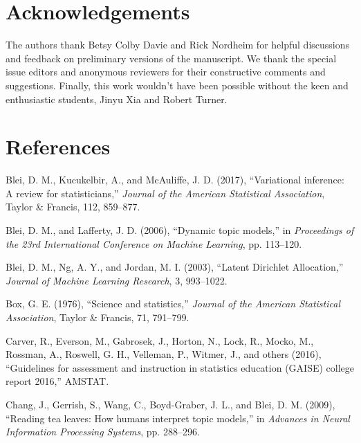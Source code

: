 \documentclass[
]{article}
\begin{document}
\hypertarget{acknowledgements}{%
\section{Acknowledgements}\label{acknowledgements}}

The authors thank Betsy Colby Davie and Rick Nordheim for helpful discussions and
feedback on preliminary versions of the manuscript. We thank the special issue
editors and anonymous reviewers for their constructive comments and suggestions. Finally, this work wouldn't have been possible without the keen and enthusiastic students, Jinyu Xia and Robert Turner.

\hypertarget{references}{%
\section{References}\label{references}}

\hypertarget{refs}{}
\leavevmode\hypertarget{ref-blei2017variational}{}%
Blei, D. M., Kucukelbir, A., and McAuliffe, J. D. (2017), ``Variational inference: A review for statisticians,'' \emph{Journal of the American Statistical Association}, Taylor \& Francis, 112, 859--877.

\leavevmode\hypertarget{ref-blei2006dynamic}{}%
Blei, D. M., and Lafferty, J. D. (2006), ``Dynamic topic models,'' in \emph{Proceedings of the 23rd International Conference on Machine Learning}, pp. 113--120.

\leavevmode\hypertarget{ref-blei2003latent}{}%
Blei, D. M., Ng, A. Y., and Jordan, M. I. (2003), ``Latent Dirichlet Allocation,'' \emph{Journal of Machine Learning Research}, 3, 993--1022.

\leavevmode\hypertarget{ref-box1976science}{}%
Box, G. E. (1976), ``Science and statistics,'' \emph{Journal of the American Statistical Association}, Taylor \& Francis, 71, 791--799.

\leavevmode\hypertarget{ref-carver2016guidelines}{}%
Carver, R., Everson, M., Gabrosek, J., Horton, N., Lock, R., Mocko, M., Rossman, A., Roswell, G. H., Velleman, P., Witmer, J., and others (2016), ``Guidelines for assessment and instruction in statistics education (GAISE) college report 2016,'' AMSTAT.

\leavevmode\hypertarget{ref-chang2009reading}{}%
Chang, J., Gerrish, S., Wang, C., Boyd-Graber, J. L., and Blei, D. M. (2009), ``Reading tea leaves: How humans interpret topic models,'' in \emph{Advances in Neural Information Processing Systems}, pp. 288--296.
\end{document}
